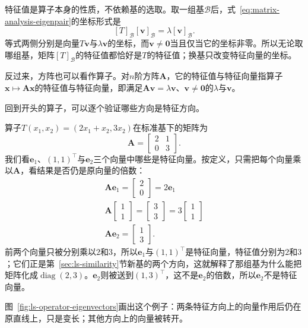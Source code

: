 特征值是算子本身的性质，不依赖基的选取。取一组基$\mathcal B$后，式~\eqref{eq:matrix-analysis-eigenpair}的坐标形式是
\[
 [T]_{\mathcal B}[\bm v]_{\mathcal B}=\lambda[\bm v]_{\mathcal B}.
\]
等式两侧分别是向量$T\bm v$与$\lambda\bm v$的坐标，而$\bm v\neq\bm0$当且仅当它的坐标非零。所以无论取哪组基，矩阵$[T]_{\mathcal B}$的特征值都恰好是$T$的特征值；换基只改变特征向量的坐标。

反过来，方阵也可以看作算子。对$n$阶方阵$\bm A$，它的特征值与特征向量指算子$\bm x\mapsto\bm A\bm x$的特征值与特征向量，即满足$\bm A\bm v=\lambda\bm v$、$\bm v\neq\bm0$的$\lambda$与$\bm v$。

回到开头的算子，可以逐个验证哪些方向是特征方向。
\begin{example}[验证特征向量]
\label{ex:ls-operator-eigenvector-check}
算子$T(x_1,x_2)=(2x_1+x_2,3x_2)$在标准基下的矩阵为
\[
 \bm A=\begin{bmatrix}2&1\\0&3\end{bmatrix}.
\]
我们看$\bm e_1$、$(1,1)^{\top}$与$\bm e_2$三个向量中哪些是特征向量。按定义，只需把每个向量乘以$\bm A$，看结果是否仍是原向量的倍数：
\[
\begin{gathered}
\bm A\bm e_1=\begin{bmatrix}2\\0\end{bmatrix}=2\bm e_1\\
\bm A\begin{bmatrix}1\\1\end{bmatrix}=\begin{bmatrix}3\\3\end{bmatrix}=3\begin{bmatrix}1\\1\end{bmatrix}\\
\bm A\bm e_2=\begin{bmatrix}1\\3\end{bmatrix}.
\end{gathered}
\]
前两个向量只被分别乘以$2$和$3$，所以$\bm e_1$与$(1,1)^{\top}$是特征向量，特征值分别为$2$和$3$；它们正是第~\ref{sec:ls-similarity}节新基的两个方向，这就解释了那组基为什么能把矩阵化成$\operatorname{diag}(2,3)$。$\bm e_2$则被送到$(1,3)^{\top}$，这不是$\bm e_2$的倍数，所以$\bm e_2$不是特征向量。
\end{example}
图~\ref{fig:ls-operator-eigenvectors}画出这个例子：两条特征方向上的向量作用后仍在原直线上，只是变长；其他方向上的向量被转开。
